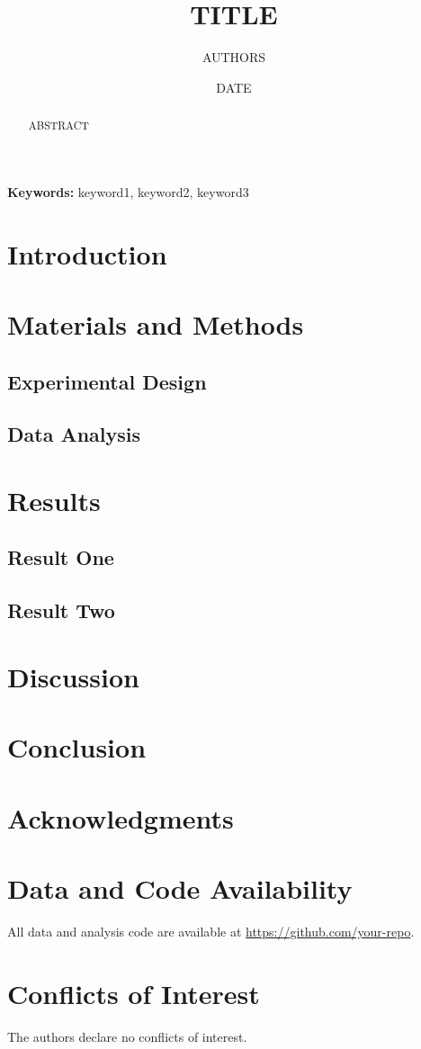\documentclass[12pt]{article}
\title{\textbf{{{TITLE}}}}
\author[1]{{{AUTHORS}}}
\affil[1]{{{AFFILIATIONS}}}
\date{{{DATE}}}
\begin{document}
\maketitle
\linenumbers
\begin{abstract}
{{ABSTRACT}}
\end{abstract}
\textbf{Keywords:} keyword1, keyword2, keyword3
\newpage
\section{Introduction}
\section{Materials and Methods}
\subsection{Experimental Design}
\subsection{Data Analysis}
\section{Results}
\subsection{Result One}
\subsection{Result Two}
\section{Discussion}
\section{Conclusion}
\section*{Acknowledgments}
\section*{Data and Code Availability}
All data and analysis code are available at \url{https://github.com/your-repo}.
\section*{Conflicts of Interest}
The authors declare no conflicts of interest.


\end{document}
